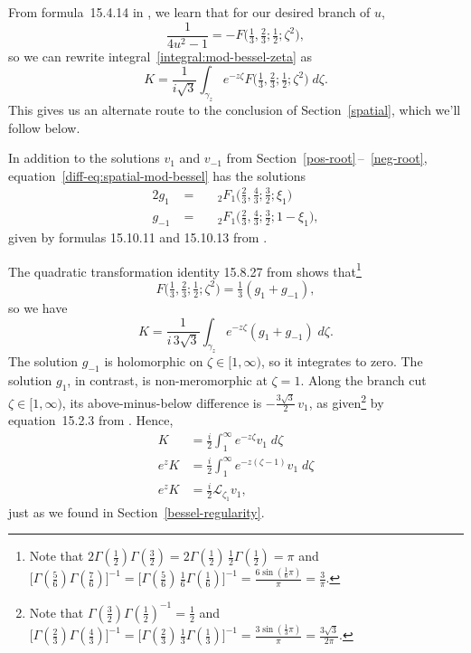 \documentclass{article}
\theoremstyle{definition}
\newcommand{\laplace}{\mathcal{L}}
\begin{document}
From formula~15.4.14 in \cite{dlmf}, we learn that for our desired branch of $u$,
\[ \frac{1}{4u^2 - 1} = -F\big(\tfrac{1}{3}, \tfrac{2}{3}; \tfrac{1}{2}; \zeta^2\big), \]
so we can rewrite integral~\eqref{integral:mod-bessel-zeta} as
\[ K = \frac{1}{i\sqrt{3}} \int_{\gamma_z} e^{-z\zeta} F\big(\tfrac{1}{3}, \tfrac{2}{3}; \tfrac{1}{2}; \zeta^2\big)\;d\zeta. \]
This gives us an alternate route to the conclusion of Section~\ref{spatial}, which we'll follow below.

In addition to the solutions $v_1$ and $v_{-1}$ from Section~\ref{pos-root}\,--\, \ref{neg-root}, equation~\eqref{diff-eq:spatial-mod-bessel} has the solutions
\begin{alignat*}{2}
g_1 &\;=\;& & {}_2F_1\big(\tfrac{2}{3}, \tfrac{4}{3}; \tfrac{3}{2}; \xi_1\big) \\
g_{-1} &\;=\;&  & {}_2F_1\big(\tfrac{2}{3}, \tfrac{4}{3}; \tfrac{3}{2}; 1-\xi_1\big),
\end{alignat*}
given by formulas 15.10.11 and 15.10.13 from \cite{dlmf}.

The quadratic transformation identity 15.8.27 from \cite{dlmf} shows that\footnote{Note that $2\Gamma(\tfrac{1}{2})\Gamma(\tfrac{3}{2}) = 2\Gamma(\tfrac{1}{2})\,\tfrac{1}{2}\Gamma(\tfrac{1}{2}) = \pi$ and $\big[\Gamma(\tfrac{5}{6})\Gamma(\tfrac{7}{6})\big]^{-1} = \big[\Gamma(\tfrac{5}{6})\,\tfrac{1}{6}\Gamma(\tfrac{1}{6})\big]^{-1} = \frac{6\sin(\tfrac{1}{6} \pi)}{\pi} = \frac{3}{\pi}$.}
\[ F\big(\tfrac{1}{3}, \tfrac{2}{3}; \tfrac{1}{2}; \zeta^2\big) = \tfrac{1}{3}(g_1 + g_{-1}), \]
so we have
\[ K = \frac{1}{i\,3\sqrt{3}} \int_{\gamma_z} e^{-z\zeta} (g_1 + g_{-1})\;d\zeta. \]
The solution $g_{-1}$ is holomorphic on $\zeta \in [1, \infty)$, so it integrates to zero. The solution $g_1$, in contrast, is non-meromorphic at $\zeta = 1$. Along the branch cut $\zeta \in [1, \infty)$, its above-minus-below difference is $-\tfrac{3\sqrt{3}}{2}\,v_1$,
as given\footnote{Note that $\Gamma(\tfrac{3}{2}) \Gamma(\tfrac{1}{2})^{-1} = \tfrac{1}{2}$ and $\big[\Gamma(\tfrac{2}{3})\Gamma(\tfrac{4}{3})\big]^{-1} = \big[\Gamma(\tfrac{2}{3})\,\tfrac{1}{3}\Gamma(\tfrac{1}{3})\big]^{-1} = \frac{3\sin(\tfrac{1}{3} \pi)}{\pi} = \frac{3\sqrt{3}}{2\pi}$.} by equation~15.2.3 from \cite{dlmf}.
Hence,
\begin{align*}
K & = \frac{i}{2} \int^\infty_1 e^{-z\zeta} v_1\;d\zeta \\
e^z K & = \frac{i}{2} \int^\infty_1 e^{-z(\zeta - 1)} v_1\;d\zeta \\
e^z K & = \tfrac{i}{2} \laplace_{\zeta_1} v_1,
\end{align*}
just as we found in Section~\ref{bessel-regularity}.
\end{document}
